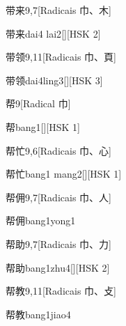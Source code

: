 \begin{entry}{带来}{9,7}[Radicais ⼱、⽊]
  \begin{phonetics}{带来}{dai4 lai2}[][HSK 2]
  \end{phonetics}
\end{entry}

\begin{entry}{带领}{9,11}[Radicais ⼱、⾴]
  \begin{phonetics}{带领}{dai4ling3}[][HSK 3]
  \end{phonetics}
\end{entry}

\begin{entry}{帮}{9}[Radical ⼱]
  \begin{phonetics}{帮}{bang1}[][HSK 1]
  \end{phonetics}
\end{entry}

\begin{entry}{帮忙}{9,6}[Radicais ⼱、⼼]
  \begin{phonetics}{帮忙}{bang1 mang2}[][HSK 1]
  \end{phonetics}
\end{entry}

\begin{entry}{帮佣}{9,7}[Radicais ⼱、⼈]
  \begin{phonetics}{帮佣}{bang1yong1}
  \end{phonetics}
\end{entry}

\begin{entry}{帮助}{9,7}[Radicais ⼱、⼒]
  \begin{phonetics}{帮助}{bang1zhu4}[][HSK 2]
  \end{phonetics}
\end{entry}

\begin{entry}{帮教}{9,11}[Radicais ⼱、⽁]
  \begin{phonetics}{帮教}{bang1jiao4}
  \end{phonetics}
\end{entry}

